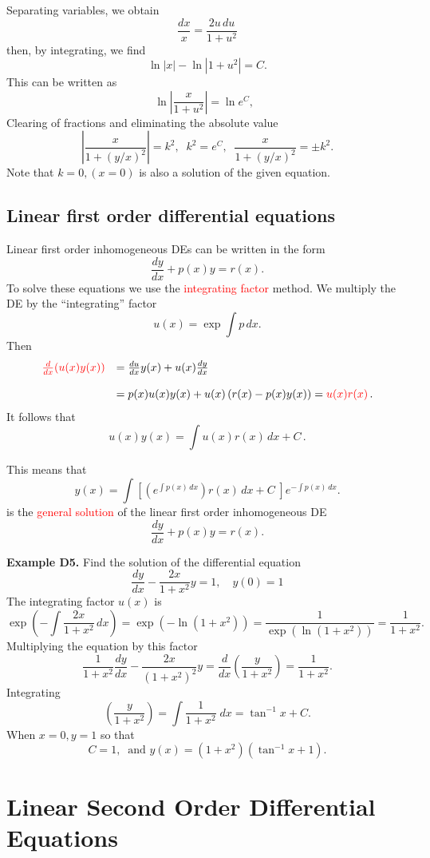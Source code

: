 \documentclass{article}
\begin{document}
Separating variables, we obtain
$$
\frac{dx}{x}= \frac{2 u\,  du}{1 +  u^2}
$$
then, by integrating, we find
$$
\ln |x| - \ln |1 +  u^2| = C.
$$
This can be written as
$$
\ln \left| \frac{x}{1+u^2} \right| =\ln e^C, \;\;
$$
Clearing of fractions and eliminating the absolute value
$$
\left| \frac{x}{1+(y/x)^2} \right| = k^2, \;\; k^2=e^C, \;\;
\frac{x}{1+(y/x)^2}  = \pm k^2.
$$
Note that $k=0, (x=0)$ is also a solution of the given equation.


\subsection{Linear first order differential equations} 

Linear first order inhomogeneous DEs can be written in the form
$$
\frac{dy}{dx} + p(x) y = r(x).
$$
To solve these equations we use the \textcolor{red}{integrating factor} method. We multiply the DE by the ``integrating'' factor
$$
u (x) = \exp \int p \, dx.
$$
Then 
$$
\begin{array}{ll}
\textcolor{red}{\frac{d}{dx}( u(x) y(x) )} & = \frac{du}{dx} y(x) + u(x) \frac{dy}{dx} \\
\\
& = p(x) u(x) y(x) + u(x) \left(r(x) - p(x) y(x) \right) = \textcolor{red}{u(x) r(x)}\,.
\end{array}
$$
It follows that
$$
u(x)y(x) = \int u(x) r(x) \, dx +C\,.
$$


This means that
$$
y(x) = \int \left[ \left( e^{\int p(x) \, dx} \right) r(x) \, dx
+C \; \right] e^{-\int p(x) \, dx}.
$$
is the \textcolor{red}{general solution} of the linear first order inhomogeneous DE
$$
\frac{dy}{dx} + p(x) y = r(x).
$$

\hrulefill

\textbf{Example D5.} Find the solution of the differential equation
$$
\frac{dy}{dx} - \frac{ 2x}{1 +x^2 }y=1, \quad y(0) = 1
$$
The integrating factor $u(x)$ is
{\small 
$$
\exp \left( - \int \frac{ 2x}{1 +x^2 } \, dx \right)=\exp \left( - \ln (1 +x^2)\right)=\frac{1}{\exp(\ln(1+x^2))} = \frac{1}{1 +x^2 }.
$$
}
Multiplying the equation by this factor
$$
\frac{ 1}{1 +x^2 } \frac{dy}{dx} - \frac{ 2x}{(1 +x^2)^2 }y=\frac{d}{d x } \left( \frac{ y}{1 +x^2 } \right) =\frac{ 1}{1 +x^2 }.
$$
Integrating
$$
\left( \frac{ y}{1 +x^2 } \right) = \int \frac{ 1}{1 +x^2 } \; dx= \tan^{-1} x+C.
$$
When $x=0, y=1$ so that
$$
C = 1, \;\; \mbox{and } y(x)= (1 +x^2 )(\tan^{-1} x+1).
$$


\section{Linear Second Order Differential Equations}
\end{document}
